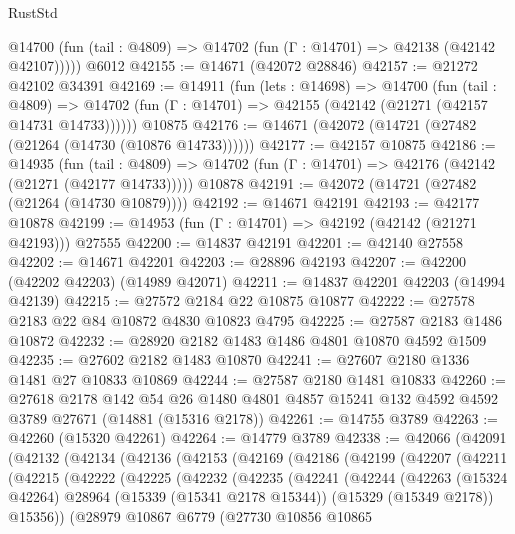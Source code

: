 \begin{lexlean}{RustStd}
\begin{coremodule}
      @14700 (fun (tail : @4809) => @14702 (fun (Γ : @14701) => @42138 (@42142 @42107)))))
    @6012
@42155 := @14671 (@42072 @28846)
@42157 := @21272 @42102 @34391
@42169 := @14911
    (fun (lets : @14698) =>
    @14700
      (fun (tail : @4809) =>
      @14702 (fun (Γ : @14701) => @42155 (@42142 (@21271 (@42157 @14731 @14733))))))
    @10875
@42176 := @14671 (@42072 (@14721 (@27482 (@21264 (@14730 (@10876 @14733))))))
@42177 := @42157 @10875
@42186 := @14935
    (fun (tail : @4809) => @14702 (fun (Γ : @14701) => @42176 (@42142 (@21271 (@42177 @14733)))))
    @10878
@42191 := @42072 (@14721 (@27482 (@21264 (@14730 @10879))))
@42192 := @14671 @42191
@42193 := @42177 @10878
@42199 := @14953 (fun (Γ : @14701) => @42192 (@42142 (@21271 @42193))) @27555
@42200 := @14837 @42191
@42201 := @42140 @27558
@42202 := @14671 @42201
@42203 := @28896 @42193
@42207 := @42200 (@42202 @42203) (@14989 @42071)
@42211 := @14837 @42201 @42203 (@14994 @42139)
@42215 := @27572 @2184 @22 @10875 @10877
@42222 := @27578 @2183 @22 @84 @10872 @4830 @10823 @4795
@42225 := @27587 @2183 @1486 @10872
@42232 := @28920 @2182 @1483 @1486 @4801 @10870 @4592 @1509
@42235 := @27602 @2182 @1483 @10870
@42241 := @27607 @2180 @1336 @1481 @27 @10833 @10869
@42244 := @27587 @2180 @1481 @10833
@42260 := @27618
    @2178
    @142
    @54
    @26
    @1480
    @4801
    @4857
    @15241
    @132
    @4592
    @4592
    @3789
    @27671
    (@14881 (@15316 @2178))
@42261 := @14755 @3789
@42263 := @42260 (@15320 @42261)
@42264 := @14779 @3789
@42338 := @42066
    (@42091
      (@42132
        (@42134
          (@42136
            (@42153
              (@42169
                (@42186
                  (@42199
                    (@42207
                      (@42211
                        (@42215
                          (@42222
                            (@42225
                              (@42232
                                (@42235
                                  (@42241
                                    (@42244
                                      (@42263
                                        (@15324 @42264)
                                        @28964
                                        (@15339 (@15341 @2178 @15344))
                                        (@15329 (@15349 @2178))
                                        @15356))
                                    (@28979
                                      @10867
                                      @6779
                                      (@27730
                                        @10856
                                        @10865

\end{coremodule}
\end{lexlean}

